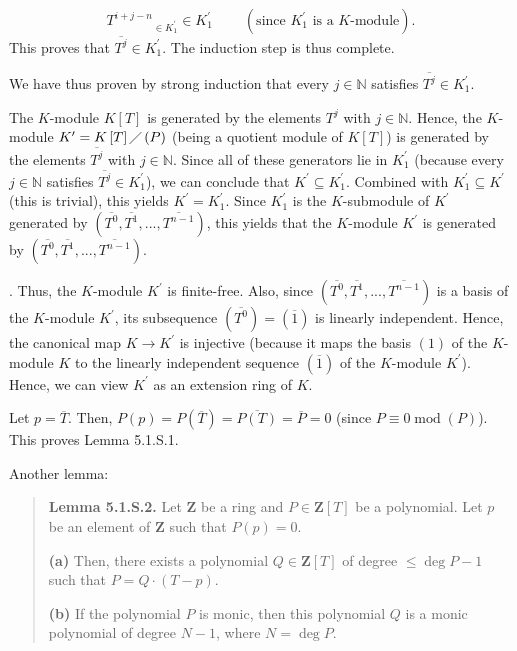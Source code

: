 \documentclass[numbers=enddot,12pt,final,onecolumn,notitlepage]{scrartcl}%
\begin{document}
{\[{{T^{i+j-n}}}_{\in K_{1}^{\prime}}\in K_{1}^{\prime}\ \ \ \ \ \ \ \ \ \ \left(
\text{since }K_{1}^{\prime}\text{ is a }K\text{-module}\right)  .
\]
This proves that $\overline{T^{j}}\in K_{1}^{\prime}$. The induction step is
thus complete.
\par
We have thus proven by strong induction that every $j\in\mathbb{N}$ satisfies
$\overline{T^{j}}\in K_{1}^{\prime}$.
\par
The $K$-module $K\left[  T\right]  $ is generated by the elements $T^{j}$ with
$j\in\mathbb{N}$. Hence, the $K$-module $K^{\prime}=K\left[  T\right]
\diagup\left(  P\right)  $ (being a quotient module of $K\left[  T\right]  $)
is generated by the elements $\overline{T^{j}}$ with $j\in\mathbb{N}$. Since
all of these generators lie in $K_{1}^{\prime}$ (because every $j\in
\mathbb{N}$ satisfies $\overline{T^{j}}\in K_{1}^{\prime}$), we can conclude
that $K^{\prime}\subseteq K_{1}^{\prime}$. Combined with $K_{1}^{\prime
}\subseteq K^{\prime}$ (this is trivial), this yields $K^{\prime}%
=K_{1}^{\prime}$. Since $K_{1}^{\prime}$ is the $K$-submodule of $K^{\prime}$
generated by $\left(  \overline{T^{0}},\overline{T^{1}},...,\overline{T^{n-1}%
}\right)  $, this yields that the $K$-module $K^{\prime}$ is generated by
$\left(  \overline{T^{0}},\overline{T^{1}},...,\overline{T^{n-1}}\right)  $.}.
Thus, the $K$-module $K^{\prime}$ is finite-free. Also, since $\left(
\overline{T^{0}},\overline{T^{1}},...,\overline{T^{n-1}}\right)  $ is a basis
of the $K$-module $K^{\prime}$, its subsequence $\left(  \overline{T^{0}%
}\right)  =\left(  \overline{1}\right)  $ is linearly independent. Hence, the
canonical map $K\rightarrow K^{\prime}$ is injective (because it maps the
basis $\left(  1\right)  $ of the $K$-module $K$ to the linearly independent
sequence $\left(  \overline{1}\right)  $ of the $K$-module $K^{\prime}$).
Hence, we can view $K^{\prime}$ as an extension ring of $K$.

Let $p=\overline{T}$. Then, $P\left(  p\right)  =P\left(  \overline{T}\right)
=\overline{P\left(  T\right)  }=\overline{P}=0$ (since $P\equiv
0\operatorname{mod}\left(  P\right)  $). This proves Lemma 5.1.S.1.

Another lemma:

\begin{quote}
\textbf{Lemma 5.1.S.2.} Let $\mathbf{Z}$ be a ring and $P\in\mathbf{Z}\left[
T\right]  $ be a polynomial. Let $p$ be an element of $\mathbf{Z}$ such that
$P\left(  p\right)  =0$.

\textbf{(a)} Then, there exists a polynomial $Q\in\mathbf{Z}\left[  T\right]
$ of degree $\leq\deg P-1$ such that $P=Q\cdot\left(  T-p\right)  $.

\textbf{(b)} If the polynomial $P$ is monic, then this polynomial $Q$ is a
monic polynomial of degree $N-1$, where $N=\deg P$.
\end{quote}
\end{document}
